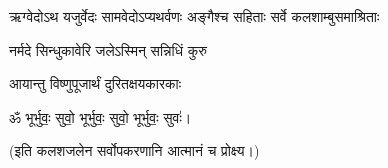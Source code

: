 {ऋग्वेदोऽथ यजुर्वेदः सामवेदोऽप्यथर्वणः}
{अङ्गैश्च सहिताः सर्वे कलशाम्बुसमाश्रिताः}

{नर्मदे सिन्धुकावेरि जलेऽस्मिन् सन्निधिं कुरु}

{आयान्तु विष्णुपूजार्थं दुरितक्षयकारकाः}

\centerline{ॐ भूर्भुवः॒ सुवो॒ भूर्भुवः॒ सुवो॒ भूर्भुवः॒ सुवः॑।}

(इति कलशजलेन सर्वोपकरणानि आत्मानं च प्रोक्ष्य।)




